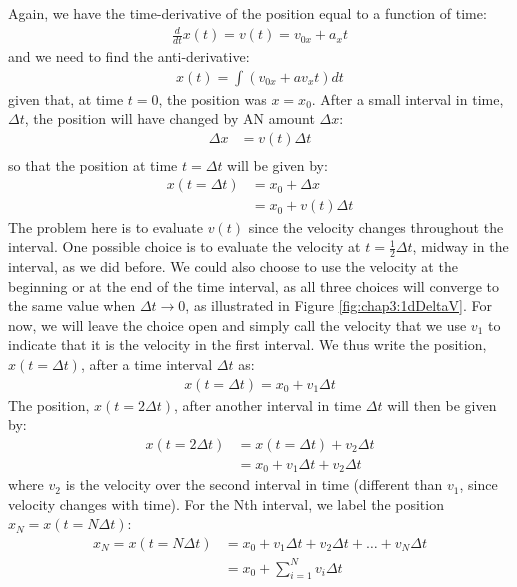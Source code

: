 Again, we have the time-derivative of the position equal to a function of time:
\begin{align*}
\frac{d}{dt}x(t)=v(t)=v_{0x}+a_xt
\end{align*}
and we need to find the anti-derivative:
\begin{align*}
x(t) = \int \left(  v_{0x}+av_xt \right) dt 
\end{align*}
given that, at time $t=0$, the position was $x=x_0$. After a small interval in time, $\Delta t$, the position will have changed by AN amount $\Delta x$:
\begin{align*}
\Delta x &= v(t) \Delta t\\
\end{align*}
so that the position at time $t=\Delta t$ will be given by:
\begin{align*}
x(t=\Delta t) &= x_0+ \Delta x\\
& = x_0+v(t) \Delta t
\end{align*}
The problem here is to evaluate $v(t)$ since the velocity changes throughout the interval. One possible choice is to evaluate the velocity at $t = \frac{1}{2}\Delta t$, midway in the interval, as we did before. We could also choose to use the velocity at the beginning or at the end of the time interval, as all three choices will converge to the same value when $\Delta t \to 0$, as illustrated in Figure \ref{fig:chap3:1dDeltaV}. For now, we will leave the choice open and simply call the velocity that we use $v_1$ to indicate that it is the velocity in the first interval. We thus write the position, $x(t=\Delta t)$, after a time interval $\Delta t$ as:
\begin{align*}
x(t=\Delta t) = x_0+v_1\Delta t
\end{align*}
The position, $x(t=2\Delta t)$, after another interval in time $\Delta t$ will then be given by:
\begin{align*}
x(t=2\Delta t) &= x(t=\Delta t)+v_2\Delta t\\
&=x_0+v_1\Delta t+v_2\Delta t
\end{align*}
where $v_2$ is the velocity over the second interval in time (different than $v_1$, since velocity changes with time). For the Nth interval, we label the position $x_N=x(t=N\Delta t)$:
\begin{align*}
x_N=x(t=N\Delta t)&=x_0+v_1\Delta t+v_2\Delta t+\dots+v_N\Delta t\\
&=x_0+\sum_{i=1}^Nv_i\Delta t 
\end{align*}

